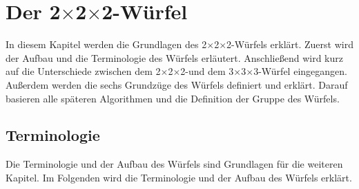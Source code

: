 \documentclass[12pt,a4paper, usenames, dvipsnames]{article}
\theoremstyle{mystyle}
\theoremstyle{definition}
\newcommand{\Ttwo}{2$\times$2$\times$2-}
\newcommand{\Tthree}{3$\times$3$\times$3-}
\begin{document}
%
%
%
%
%
%
%
%
%
%
%
%
\newpage
\section{Der \Ttwo Würfel}

\label{Kapitel_Würfel}

In diesem Kapitel werden die Grundlagen des \Ttwo Würfels erklärt. Zuerst wird der Aufbau und die Terminologie des Würfels erläutert. Anschließend wird kurz auf die Unterschiede zwischen dem \Ttwo und dem \Tthree Würfel eingegangen. 
Außerdem werden die sechs Grundzüge des Würfels definiert und erklärt. Darauf basieren alle späteren Algorithmen und die Definition der Gruppe des Würfels. 


%
%
%
%
%
%
%
%
%
%
\subsection{Terminologie}

Die Terminologie und der Aufbau des Würfels sind Grundlagen für die weiteren Kapitel.
Im Folgenden wird die Terminologie und der Aufbau des Würfels erklärt.
\end{document}
